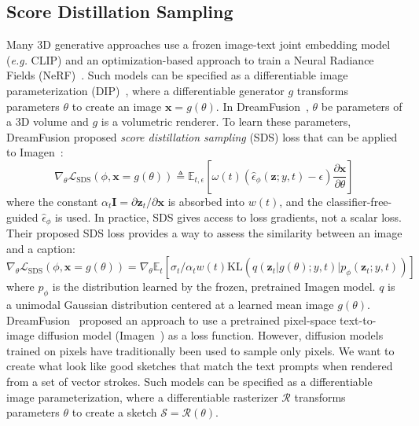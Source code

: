 \documentclass{article}
\begin{document}
\subsection{Score Distillation Sampling}

Many 3D generative approaches use a frozen image-text joint embedding model (\textit{e.g.} CLIP) and an optimization-based approach to train a Neural Radiance Fields (NeRF)~\cite{nerf_mildenhall_2021}.
Such models can be specified as a differentiable image parameterization (DIP)~\cite{differentiable_mordvintsev_2018}, where a differentiable generator $g$ transforms parameters $\theta$ to create an image $\bm{x} = g(\theta)$.
In DreamFusion~\cite{poole_2023_dreamfusion}, $\theta$ be parameters of a 3D volume and $g$ is a volumetric renderer.
To learn these parameters, DreamFusion proposed \textit{score distillation sampling} (SDS) loss that can be applied to Imagen~\cite{imagen_2022_saharia}:
\begin{equation}
\nabla_{\theta} \mathcal{L}_{\mathrm{SDS}} (\phi, \bm{x}=g(\theta)) \triangleq \mathbb{E}_{t,\epsilon} \left[ 
\omega(t) (\hat{\epsilon}_{\phi}(\bm{z};y,t) - \epsilon) 
\frac{\partial \bm{x}}{\partial \theta}
\right]
\end{equation}
where the constant $\alpha_t \bm{I} = \partial \bm{z}_t / \partial \bm{x}$ is absorbed into $w(t)$, and the classifier-free-guided $\hat{\epsilon}_{\phi}$ is used.
In practice, SDS gives access to loss gradients, not a scalar loss. Their proposed SDS loss provides a way to assess the similarity between an image and a caption:
\begin{equation}
\nabla_{\theta} \mathcal{L}_{\mathrm{SDS}}(\phi, \bm{x}=g(\theta))
=
\nabla_{\theta} \mathbb{E}_{t} \left[
\sigma_{t} / \alpha_{t} w(t) 
\mathrm{KL}
\left(
q\left(\bm{z}_{t} | g(\theta) ; y, t\right)|p_{\phi}\left(\bm{z}_{t} ; y, t\right)
\right)
\right]
\end{equation}
where $p_{\phi}$ is the distribution learned by the frozen, pretrained Imagen model. $q$ is a unimodal Gaussian distribution centered at a learned mean image $g(\theta)$.
DreamFusion~\cite{poole_2023_dreamfusion} proposed an approach to use a pretrained pixel-space text-to-image diffusion model (Imagen~\cite{imagen_2022_saharia}) as a loss function. However, diffusion models trained on pixels have traditionally been used to sample only pixels.
We want to create what look like good sketches that match the text prompts when rendered from a set of vector strokes.
Such models can be specified as a differentiable image parameterization, where a differentiable rasterizer $\mathcal{R}$ transforms parameters $\theta$ to create a sketch $\mathcal{S} = \mathcal{R}(\theta)$.
\end{document}
